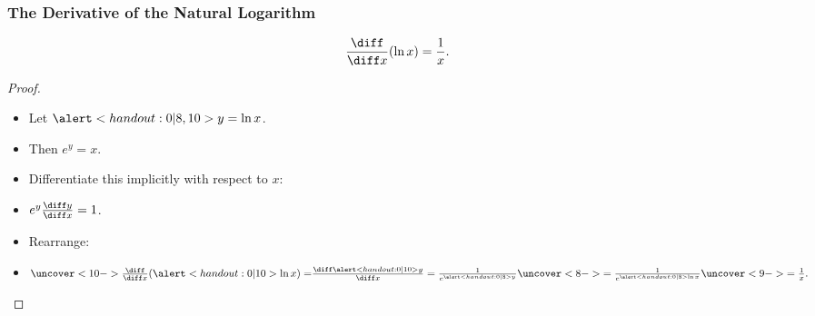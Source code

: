 \begin{frame}
\frametitle{The Derivative of the Natural Logarithm}
\begin{theorem}
\[
\frac{\diff}{\diff x} (\ln x) = \frac{1}{x} .
\]
\end{theorem}
\begin{proof}
\begin{itemize}
\item<2->  Let $\alert<handout:0| 8,10>{y = \ln x}$.
\item<3->  Then $e^y = x$.
\item<4->  Differentiate this implicitly with respect to $x$:
\item<5->  $e^y \frac{\diff y}{\diff x} = 1$.
\item<6->  Rearrange:
\item<7->  $\uncover<10->{\frac{\diff}{\diff x} (\alert<handout:0| 10>{\ln x}) = } \frac{\diff \alert<handout:0| 10>{y}}{\diff x} = \frac{1}{e^{\alert<handout:0| 8>{y}}} \uncover<8->{ = \frac{1}{e^{\alert<handout:0| 8>{\ln x}}}} \uncover<9->{ = \frac{1}{x}.}$
\end{itemize}
\end{proof}
\end{frame}
